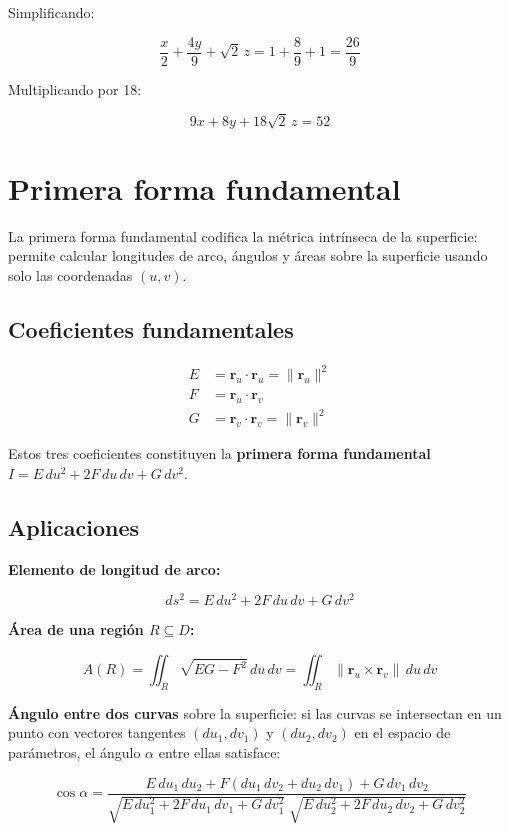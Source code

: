 \documentclass[
]{book}
\begin{document}
Simplificando:

\[
\frac{x}{2} + \frac{4y}{9} + \sqrt{2}\,z = 1 + \frac{8}{9} + 1 = \frac{26}{9}
\]

Multiplicando por 18:

\[
9x + 8y + 18\sqrt{2}\,z = 52
\]

\section{Primera forma fundamental}\label{primera-forma-fundamental}

La primera forma fundamental codifica la métrica intrínseca de la superficie: permite calcular longitudes de arco, ángulos y áreas sobre la superficie usando solo las coordenadas \((u, v)\).

\subsection{Coeficientes fundamentales}\label{coeficientes-fundamentales}

\[
\begin{aligned}
E &= \mathbf{r}_u \cdot \mathbf{r}_u = \|\mathbf{r}_u\|^2 \\
F &= \mathbf{r}_u \cdot \mathbf{r}_v \\
G &= \mathbf{r}_v \cdot \mathbf{r}_v = \|\mathbf{r}_v\|^2
\end{aligned}
\]

Estos tres coeficientes constituyen la \textbf{primera forma fundamental} \(I = E\,du^2 + 2F\,du\,dv + G\,dv^2\).

\subsection{Aplicaciones}\label{aplicaciones}

\textbf{Elemento de longitud de arco:}

\[
ds^2 = E\,du^2 + 2F\,du\,dv + G\,dv^2
\]

\textbf{Área de una región \(R \subseteq D\):}

\[
A(R) = \iint_R \sqrt{EG - F^2} \, du\, dv = \iint_R \|\mathbf{r}_u \times \mathbf{r}_v\| \, du\, dv
\]

\textbf{Ángulo entre dos curvas} sobre la superficie: si las curvas se intersectan en un punto con vectores tangentes \((du_1, dv_1)\) y \((du_2, dv_2)\) en el espacio de parámetros, el ángulo \(\alpha\) entre ellas satisface:

\[
\cos\alpha = \frac{E\,du_1\,du_2 + F(du_1\,dv_2 + du_2\,dv_1) + G\,dv_1\,dv_2}{\sqrt{E\,du_1^2 + 2F\,du_1\,dv_1 + G\,dv_1^2} \; \sqrt{E\,du_2^2 + 2F\,du_2\,dv_2 + G\,dv_2^2}}
\]
\end{document}
